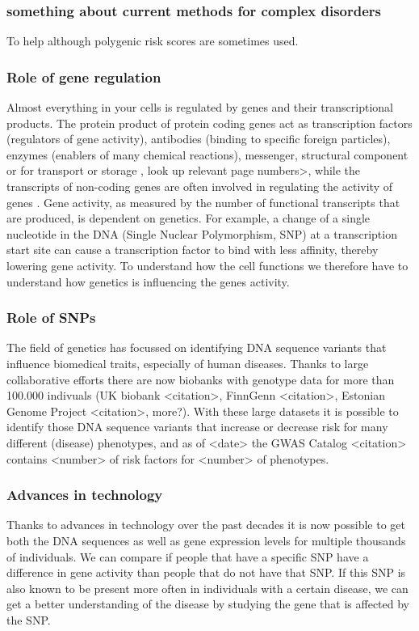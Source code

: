 \subsubsection{something about current methods for complex disorders}
To help although polygenic risk scores are sometimes used\cite{natarajanpradeepPolygenicRiskScore2017}.

\subsubsection{Role of gene regulation}
Almost everything in your cells is regulated by genes and their transcriptional products. The protein product of protein coding genes act as transcription factors (regulators of gene activity), antibodies (binding to specific foreign particles), enzymes (enablers of many chemical reactions), messenger, structural component or for transport or storage \cite{uzmanMolecularBiologyCell2003}, look up relevant page numbers>, while the transcripts of non-coding genes are often involved in regulating the activity of genes \cite{shabalinaMammalianTranscriptomeFunction2004a}. Gene activity, as measured by the number of functional transcripts that are produced, is dependent on genetics. For example, a change of a single nucleotide in the DNA (Single Nuclear Polymorphism, SNP) at a transcription start site can cause a transcription factor to bind with less affinity, thereby lowering gene activity. To understand how the cell functions we therefore have to understand how genetics is influencing the genes activity. 

\subsubsection{Role of SNPs}
The field of genetics has focussed on identifying DNA sequence variants that influence biomedical traits, especially of human diseases\cite{claussnitzerBriefHistoryHuman2020b}. Thanks to large collaborative efforts there are now biobanks with genotype data for more than 100.000 indivuals (UK biobank <citation>, FinnGenn <citation>, Estonian Genome Project <citation>, more?). With these large datasets it is possible to identify those DNA sequence variants that increase or decrease risk for many different (disease) phenotypes, and as of <date> the GWAS Catalog <citation> contains <number> of risk factors for <number> of phenotypes. 

\subsubsection{Advances in technology}
Thanks to advances in technology over the past decades it is now possible to get both the DNA sequences as well as gene expression levels for multiple thousands of individuals. We can compare if people that have a specific SNP have a difference in gene activity than people that do not have that SNP. If this SNP is also known to be present more often in individuals with a certain disease, we can get a better understanding of the disease by studying the gene that is affected by the SNP. 

